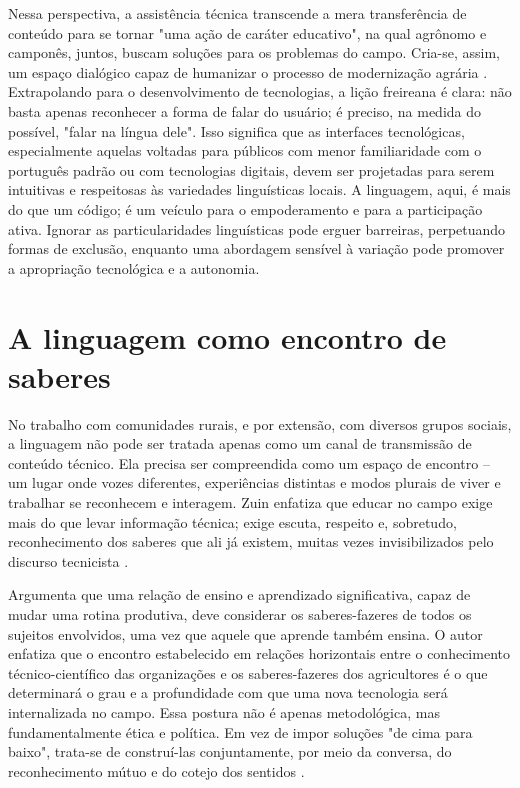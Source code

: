 Nessa perspectiva, a assistência técnica transcende a mera transferência de conteúdo para se tornar "uma ação de caráter educativo", na qual agrônomo e camponês, juntos, buscam soluções para os problemas do campo. Cria-se, assim, um espaço dialógico capaz de humanizar o processo de modernização agrária \cite{freire2013extensao}. Extrapolando para o desenvolvimento de tecnologias, a lição freireana é clara: não basta apenas reconhecer a forma de falar do usuário; é preciso, na medida do possível, "falar na língua dele". Isso significa que as interfaces tecnológicas, especialmente aquelas voltadas para públicos com menor familiaridade com o português padrão ou com tecnologias digitais, devem ser projetadas para serem intuitivas e respeitosas às variedades linguísticas locais. A linguagem, aqui, é mais do que um código; é um veículo para o empoderamento e para a participação ativa. Ignorar as particularidades linguísticas pode erguer barreiras, perpetuando formas de exclusão, enquanto uma abordagem sensível à variação pode promover a apropriação tecnológica e a autonomia.


\section{A linguagem como encontro de saberes}
No trabalho com comunidades rurais, e por extensão, com diversos grupos sociais, a linguagem não pode ser tratada apenas como um canal de transmissão de conteúdo técnico. Ela precisa ser compreendida como um espaço de encontro – um lugar onde vozes diferentes, experiências distintas e modos plurais de viver e trabalhar se reconhecem e interagem. Zuin enfatiza que educar no campo exige mais do que levar informação técnica; exige escuta, respeito e, sobretudo, reconhecimento dos saberes que ali já existem, muitas vezes invisibilizados pelo discurso tecnicista \cite{zuin2021comunicacao}.

 Argumenta que uma relação de ensino e aprendizado significativa, capaz de mudar uma rotina produtiva, deve considerar os saberes-fazeres de todos os sujeitos envolvidos, uma vez que aquele que aprende também ensina. O autor enfatiza que o encontro estabelecido em relações horizontais entre o conhecimento técnico-científico das organizações e os saberes-fazeres dos agricultores é o que determinará o grau e a profundidade com que uma nova tecnologia será internalizada no campo. Essa postura não é apenas metodológica, mas fundamentalmente ética e política. Em vez de impor soluções "de cima para baixo", trata-se de construí-las conjuntamente, por meio da conversa, do reconhecimento mútuo e do cotejo dos sentidos \cite{zuin2021comunicacao}.

